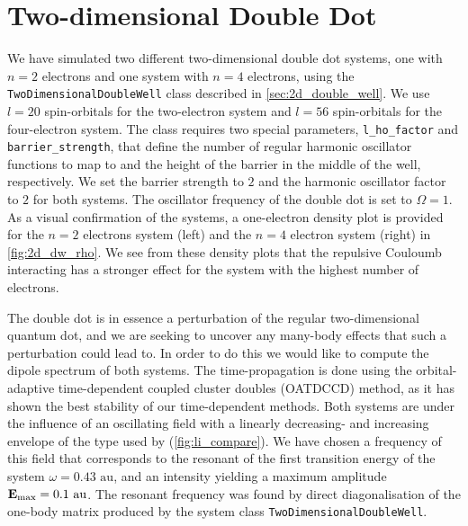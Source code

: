 \section{Two-dimensional Double Dot}

We have simulated two different two-dimensional double dot systems, one with $n=2$ electrons 
and 
one system with $n=4$ electrons, using the \lstinline{TwoDimensionalDoubleWell} class described
in \autoref{sec:2d_double_well}. We use $l=20$ spin-orbitals for the two-electron system 
and $l=56$ spin-orbitals for the four-electron system. The class requires two special parameters, 
\lstinline{l_ho_factor} and \lstinline{barrier_strength}, that define the 
number of regular harmonic oscillator functions to map to and the height of the 
barrier in the middle of the well, respectively. We set the barrier strength to $2$ 
and the harmonic oscillator factor to $2$ for both systems. The oscillator frequency 
of the double dot is set to $\Omega=1$. As a visual confirmation of the systems, a 
one-electron density plot is provided for the $n=2$ electrons system (left) and 
the $n=4$ electron system (right) in \autoref{fig:2d_dw_rho}. We see from these density plots 
that the repulsive Couloumb interacting has a stronger effect for the system with the 
highest number of electrons.

The double dot is in essence a perturbation of the regular two-dimensional quantum dot,
and we are seeking to uncover any many-body 
effects that such a perturbation could lead to. In order to do this we would like to 
compute the dipole spectrum of both systems. The time-propagation is done using the 
orbital-adaptive time-dependent coupled cluster doubles (OATDCCD) method, as it has shown 
the best stability of our time-dependent methods. Both systems are under the influence of an 
oscillating field with a linearly decreasing- and increasing envelope of the type used by 
\citeauthor{li2005time}\cite{li2005time} (\autoref{fig:li_compare}). We have chosen a 
frequency of this field that corresponds to the resonant of the first transition energy 
of the system $\omega = 0.43 \text{ au}$, and an intensity yielding a maximum amplitude
$\vb{E}_\text{max} = 0.1 \text{ au}$. The resonant frequency was found by direct diagonalisation 
of the one-body matrix produced by the system class \lstinline{TwoDimensionalDoubleWell}.

